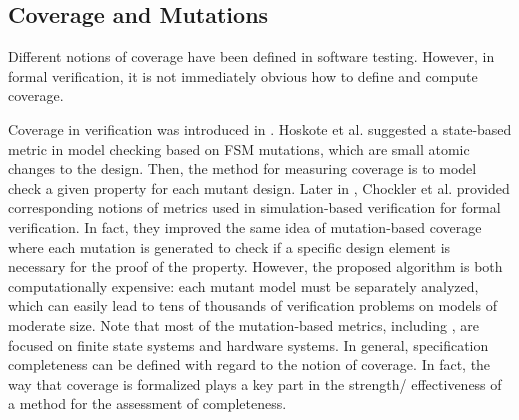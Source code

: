 \subsection{Coverage and Mutations}

Different notions of coverage have been defined in software testing. However, in formal verification, it is not immediately obvious how to define and compute coverage.

Coverage in verification was introduced in \cite{hoskote1999coverage, katz1999have}. Hoskote et al. \cite{hoskote1999coverage} suggested a state-based metric in model checking based on FSM mutations, which are small atomic changes to the design. Then, the method for measuring coverage is to model check a given property for each mutant design.
Later in \cite{chockler_coverage_2003}, Chockler et al. provided corresponding notions of metrics used in simulation-based verification for formal verification. In fact, they improved the same idea of mutation-based coverage where each mutation is generated to check if a specific
design element is necessary for the proof of the property.
 However, the proposed algorithm is both computationally expensive: each mutant model must be separately analyzed, which can easily lead to tens of thousands of verification problems on models of moderate size. Note that most of the mutation-based metrics, including \cite{kupferman_theory_2008, chockler2001practical}, are focused on finite state systems and hardware systems.
In general, specification completeness can be defined with
regard to the notion of coverage. In fact, the way that coverage
is formalized plays a key part in the strength/ effectiveness of
a method for the assessment of completeness.

